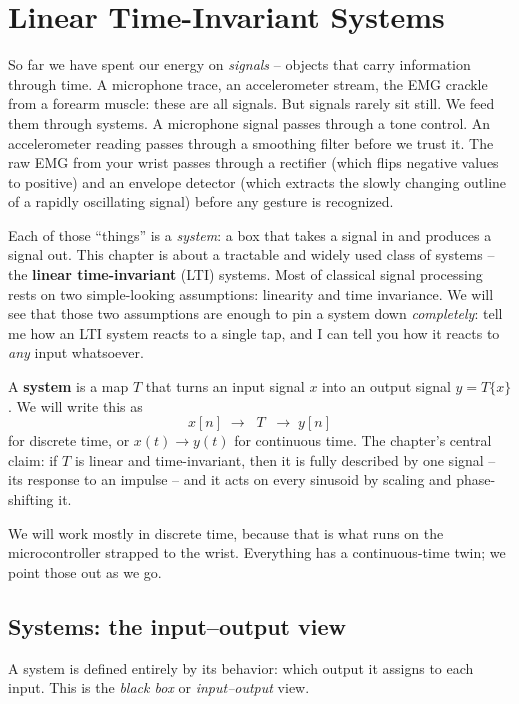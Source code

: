 \chapter{Linear Time-Invariant Systems}

So far we have spent our energy on \emph{signals} -- objects that carry
information through time. A microphone trace, an accelerometer stream, the EMG
crackle from a forearm muscle: these are all signals. But signals rarely sit
still. We feed them through systems. A microphone signal passes through a tone
control. An accelerometer reading passes through a smoothing filter before we
trust it. The raw EMG from your wrist passes through a rectifier (which flips negative values to positive) and an envelope
detector (which extracts the slowly changing outline of a rapidly oscillating signal) before any gesture is recognized.

Each of those ``things'' is a \emph{system}: a box that takes a signal in and
produces a signal out. This chapter is about a tractable and widely used
class of systems -- the \textbf{linear
time-invariant} (LTI) systems. Most of classical signal processing rests on two simple-looking assumptions: linearity and time invariance. We will see that those two assumptions are
enough to pin a system down \emph{completely}: tell me how an LTI
system reacts to a single tap, and I can tell you how it reacts to \emph{any}
input whatsoever.

\begin{focusbox}
A \textbf{system} is a map $T$ that turns an input signal $x$ into an output
signal $y = T\{x\}$. We will write this as
\[
  x[n] \;\longrightarrow\; \boxed{\;T\;}\; \longrightarrow\; y[n]
\]
for discrete time, or $x(t)\to y(t)$ for continuous time. The chapter's central
claim: if $T$ is linear and time-invariant, then it is fully described by one
signal -- its response to an impulse -- and it acts on every sinusoid by
scaling and phase-shifting it.
\end{focusbox}

We will work mostly in discrete time, because that is what runs on the
microcontroller strapped to the wrist. Everything has a continuous-time twin;
we point those out as we go.

\section{Systems: the input--output view}
\label{ch12:system-view}

A system is defined entirely by its behavior: which output it assigns to each input. This is the \emph{black box} or \emph{input--output} view.

